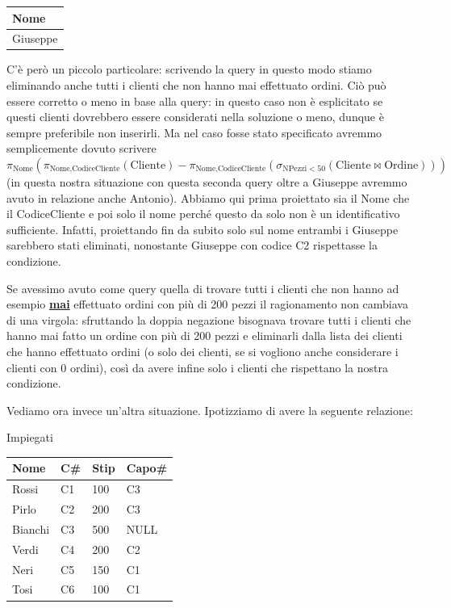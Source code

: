 \documentclass[11pt, a4paper, titlepage, oneside]{scrbook}
\begin{document}
\begin{center}
\begin{tabular}{|l|}
\hline
\textbf{Nome} \\ \hline
Giuseppe \\ \hline
\end{tabular}
\end{center}

C'è però un piccolo particolare: scrivendo la query in questo modo stiamo eliminando anche tutti i clienti che non hanno mai effettuato ordini. Ciò può essere corretto o meno in base alla query: in questo caso non è esplicitato se questi clienti dovrebbero essere considerati nella soluzione o meno, dunque è sempre preferibile non inserirli. Ma nel caso fosse stato specificato avremmo semplicemente dovuto scrivere $\pi_{\text{Nome}}(\pi_{\text{Nome}, \text{CodiceCliente}}(\text{Cliente}) - \pi_{\text{Nome}, \text{CodiceCliente}}(\sigma_{\text{NPezzi}<50}(\text{Cliente} \bowtie \text{Ordine})))$ (in questa nostra situazione con questa seconda query oltre a Giuseppe avremmo avuto in relazione anche Antonio). 
\NB Abbiamo qui prima proiettato sia il Nome che il CodiceCliente e poi solo il nome perché questo da solo non è un identificativo sufficiente. Infatti, proiettando fin da subito solo sul nome entrambi i Giuseppe sarebbero stati eliminati, nonostante Giuseppe con codice C2 rispettasse la condizione.

Se avessimo avuto come query quella di trovare tutti i clienti che non hanno ad esempio \underline{\textbf{mai}} effettuato ordini con più di 200 pezzi il ragionamento non cambiava di una virgola: sfruttando la doppia negazione bisognava trovare tutti i clienti che hanno mai fatto un ordine con più di 200 pezzi e eliminarli dalla lista dei clienti che hanno effettuato ordini (o solo dei clienti, se si vogliono anche considerare i clienti con 0 ordini), così da avere infine solo i clienti che rispettano la nostra condizione.

Vediamo ora invece un'altra situazione. Ipotizziamo di avere la seguente relazione:

\begin{center}
            Impiegati 

\begin{tabular}{|l|l|l|l|}
\hline
\textbf{Nome} & \textbf{C\#} & \textbf{Stip} & \textbf{Capo\#}\\ \hline
Rossi & C1 & 100 & C3 \\
Pirlo & C2 & 200 & C3 \\
Bianchi & C3 & 500 & NULL \\
Verdi & C4 & 200 & C2 \\
Neri & C5 & 150 & C1 \\
Tosi & C6 & 100 & C1 \\ \hline
\end{tabular}
\end{center}
\end{document}
